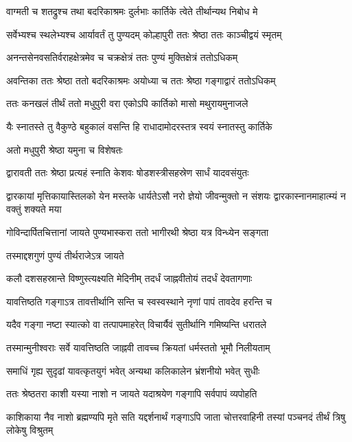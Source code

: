 \twolineshloka
{वाग्मती च शतद्रुश्च तथा बदरिकाश्रमः}
{दुर्लभाः कार्तिके त्वेते तीर्थान्यथ निबोध मे} %

\twolineshloka
{सर्वेभ्यश्च स्थलेभ्यश्च आर्यावर्तं तु पुण्यदम्}
{कोल्हापुरी ततः श्रेष्ठा ततः काञ्चीद्वयं स्मृतम्} %

\twolineshloka
{अनन्तसेनवसतिर्वराहक्षेत्रमेव च}
{चक्रक्षेत्रं ततः पुण्यं मुक्तिक्षेत्रं ततोऽधिकम्} %

\twolineshloka
{अवन्तिका ततः श्रेष्ठा ततो बदरिकाश्रमः}
{अयोध्या च ततः श्रेष्ठा गङ्गाद्वारं ततोऽधिकम्} %

\twolineshloka
{ततः कनखलं तीर्थं ततो मधुपुरी वरा}
{एकोऽपि कार्तिको मासो मथुरायमुनाजले} %

\twolineshloka
{यैः स्नातस्ते तु वैकुण्ठे बहुकालं वसन्ति हि}
{राधादामोदरस्तत्र स्वयं स्नातस्तु कार्तिके} %


\onelineshloka
{अतो मधुपुरी श्रेष्ठा यमुना च विशेषतः} %

\twolineshloka
{द्वारावती ततः श्रेष्ठा प्रत्यहं स्नाति केशवः}
{षोडशस्त्रीसहस्रेण सार्धं यादवसंयुतः} %

\threelineshloka
{द्वारकायां मृत्तिकायास्तिलको येन मस्तके}
{धार्यतेऽसौ नरो ज्ञेयो जीवन्मुक्तो न संशयः}
{द्वारकास्नानमाहात्म्यं न वक्तुं शक्यते मया} %

\twolineshloka
{गोविन्दार्पितचित्तानां जायते पुण्यभास्करा}
{ततो भागीरथी श्रेष्ठा यत्र विन्ध्येन सङ्गता} %


\onelineshloka
{तस्माद्दशगुणं पुण्यं तीर्थराजेऽत्र जायते} %

\twolineshloka
{कलौ दशसहस्रान्ते विष्णुस्त्यक्ष्यति मेदिनीम्}
{तदर्धं जाह्नवीतोयं तदर्धं देवतागणाः} %

\twolineshloka
{यावत्तिष्ठति गङ्गाऽत्र तावत्तीर्थानि सन्ति च}
{स्वस्वस्थाने नृणां पापं तावदेव हरन्ति च} %

\twolineshloka
{यदैव गङ्गा नष्टा स्यात्को वा तत्पापमाहरेत्}
{विचार्यैवं सुतीर्थानि गमिष्यन्ति धरातले} %

\twolineshloka
{तस्मान्मुनीश्वराः सर्वे यावत्तिष्ठति जाह्नवी}
{तावच्च क्रियतां धर्मस्ततो भूमौ निलीयताम्} %

\twolineshloka
{समाधिं गृह्य सुदृढां यावत्कृतयुगं भवेत्}
{अन्यथा कलिकालेन भ्रंशनीयो भवेत् सुधीः} %

\twolineshloka
{ततः श्रेष्ठतरा काशी यस्या नाशो न जायते}
{यदाश्रयेण गङ्गापि सर्वपापं व्यपोहति} %

\threelineshloka
{काशिकाया नैव नाशो ब्रह्मण्यपि मृते सति}
{यद्दर्शनार्थं गङ्गाऽपि जाता चोत्तरवाहिनी}
{तस्यां पञ्चनदं तीर्थं त्रिषु लोकेषु विश्रुतम्} %

